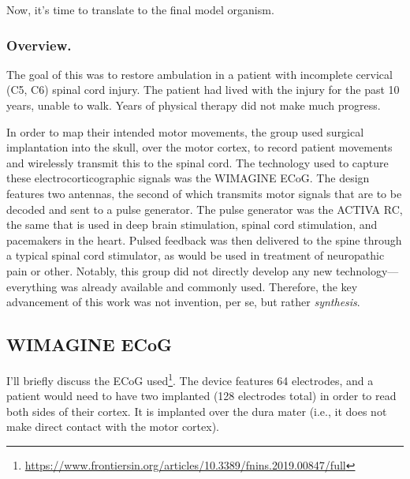 Now, it's time to translate to the final model organism.

\subsubsection{Overview.} 

The goal of this was to restore ambulation in a patient with incomplete cervical (C5, C6) spinal cord injury. The patient had lived with the injury for the past 10 years, unable to walk. Years of physical therapy did not make much progress.\newline 

In order to map their intended motor movements, the group used surgical implantation into the skull, over the motor cortex, to record patient movements and wirelessly transmit this to the spinal cord. The technology used to capture these electrocorticographic signals was the WIMAGINE ECoG. The design features two antennas, the second of which transmits motor signals that are to be decoded and sent to a pulse generator. The pulse generator was the ACTIVA RC, the same that is used in deep brain stimulation, spinal cord stimulation, and pacemakers in the heart. Pulsed feedback was then delivered to the spine through a typical spinal cord stimulator, as would be used in treatment of neuropathic pain or other. Notably, this group did not directly develop any new technology---everything was already available and commonly used. Therefore, the key advancement of this work was not invention, per se, but rather \textit{synthesis}. 

\subsection{WIMAGINE ECoG}
I'll briefly discuss the ECoG used\footnote{\url{https://www.frontiersin.org/articles/10.3389/fnins.2019.00847/full}}. The device features 64 electrodes, and a patient would need to have two implanted (128 electrodes total) in order to read both sides of their cortex. It is implanted over the dura mater (i.e., it does not make direct contact with the motor cortex).\newline

